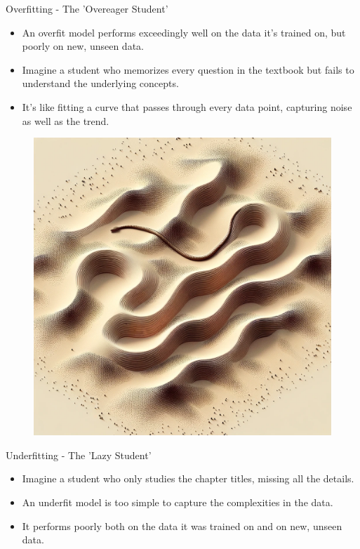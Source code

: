 \documentclass{beamer}
\begin{document}
\begin{frame}{Overfitting - The 'Overeager Student'}
\begin{itemize}
\item An overfit model performs exceedingly well on the data it's trained on, but poorly on new, unseen data.
\item Imagine a student who memorizes every question in the textbook but fails to understand the underlying concepts.
\item It’s like fitting a curve that passes through every data point, capturing noise as well as the trend.
\end{itemize}

\end{frame}


\begin{frame}
  \begin{figure}
    \includegraphics[scale=0.25]{./lecture_includes/overfit_snake.png}
  \end{figure}
\end{frame}


\begin{frame}{Underfitting - The 'Lazy Student'}
\begin{itemize}
\item Imagine a student who only studies the chapter titles, missing all the details.
\item An underfit model is too simple to capture the complexities in the data.
\item It performs poorly both on the data it was trained on and on new, unseen data.
\end{itemize}
\end{frame}
\end{document}
